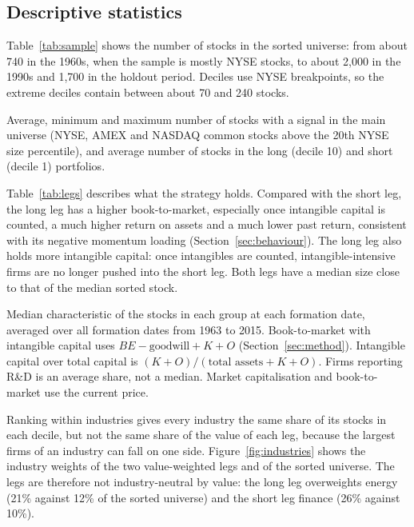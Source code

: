 \documentclass[12pt,a4paper]{article}
\newcommand{\tablenote}[1]{\par\vspace{4pt}\begin{minipage}{\linewidth}\footnotesize\singlespacing #1\end{minipage}}
\begin{document}
\subsection{Descriptive statistics}

Table~\ref{tab:sample} shows the number of stocks in the sorted universe: from about 740 in the
1960s, when the sample is mostly NYSE stocks, to about 2,000 in the 1990s and 1,700 in the holdout
period. Deciles use NYSE breakpoints, so the extreme deciles contain between about 70 and 240 stocks.

\begin{table}[H]
\centering
\caption{Sample: number of stocks sorted each month}\label{tab:sample}

\tablenote{Average, minimum and maximum number of stocks with a signal in the main universe (NYSE,
AMEX and NASDAQ common stocks above the 20th NYSE size percentile), and average number of stocks in
the long (decile 10) and short (decile 1) portfolios.}
\end{table}

Table~\ref{tab:legs} describes what the strategy holds. Compared with the short leg, the long leg
has a higher book-to-market, especially once intangible capital is counted, a much higher return on
assets and a much lower past return, consistent with its negative momentum loading
(Section~\ref{sec:behaviour}). The long leg also holds more intangible capital: once intangibles are
counted, intangible-intensive firms are no longer pushed into the short leg. Both legs have a median
size close to that of the median sorted stock.

\begin{table}[H]
\centering
\caption{Characteristics of the long and short portfolios, 1963--2015}\label{tab:legs}
\resizebox{\textwidth}{!}{}
\tablenote{Median characteristic of the stocks in each group at each formation date, averaged over all
formation dates from 1963 to 2015. Book-to-market with intangible capital uses $BE - \text{goodwill} +
K + O$ (Section~\ref{sec:method}). Intangible capital over total capital is $(K+O)/(\text{total
assets}+K+O)$. Firms reporting R\&D is an average share, not a median. Market capitalisation and
book-to-market use the current price.}
\end{table}

Ranking within industries gives every industry the same share of its stocks in each decile, but not
the same share of the value of each leg, because the largest firms of an industry can fall on one
side. Figure~\ref{fig:industries} shows the industry weights of the two value-weighted legs and of the
sorted universe. The legs are therefore not industry-neutral by value: the long leg overweights energy
(21\% against 12\% of the sorted universe) and the short leg finance (26\% against 10\%).
\end{document}
